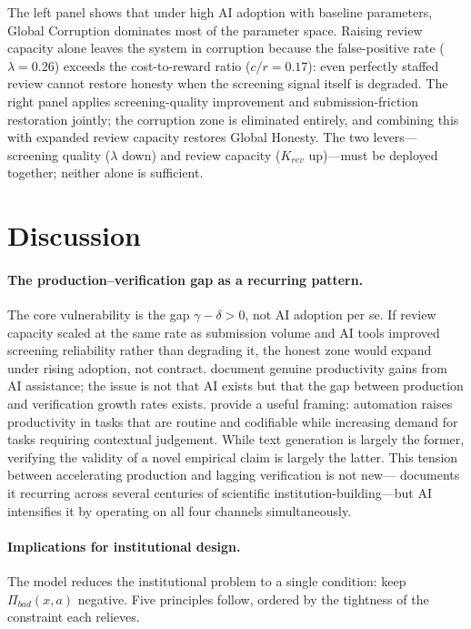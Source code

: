 \documentclass{article}
\begin{document}
The left panel shows that under high AI adoption with baseline parameters, Global Corruption dominates most of the parameter space.
Raising review capacity alone leaves the system in corruption because the false-positive rate ($\lambda = 0.26$) exceeds the cost-to-reward ratio ($c/r = 0.17$): even perfectly staffed review cannot restore honesty when the screening signal itself is degraded.
The right panel applies screening-quality improvement and submission-friction restoration jointly; the corruption zone is eliminated entirely, and combining this with expanded review capacity restores Global Honesty.
The two levers---screening quality ($\lambda$ down) and review capacity ($K_{rev}$ up)---must be deployed together; neither alone is sufficient.

\section{Discussion}
\label{sec:discussion}

\paragraph{The production--verification gap as a recurring pattern.}
The core vulnerability is the gap $\gamma - \delta > 0$, not AI adoption per se.
If review capacity scaled at the same rate as submission volume and AI tools improved screening reliability rather than degrading it, the honest zone would expand under rising adoption, not contract.
\citet{NoyZhang2023} document genuine productivity gains from AI assistance; the issue is not that AI exists but that the gap between production and verification growth rates exists.
\citet{AcemogluRestrepo2019} provide a useful framing: automation raises productivity in tasks that are routine and codifiable while increasing demand for tasks requiring contextual judgement.
While text generation is largely the former, verifying the validity of a novel empirical claim is largely the latter.
This tension between accelerating production and lagging verification is not new---\citet{Mokyr2002} documents it recurring across several centuries of scientific institution-building---but AI intensifies it by operating on all four channels simultaneously.

\paragraph{Implications for institutional design.}
The model reduces the institutional problem to a single condition: keep $\Pi_{bad}(x, a)$ negative.
Five principles follow, ordered by the tightness of the constraint each relieves.
\end{document}
